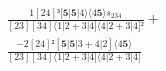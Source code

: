 \documentclass[varwidth, border=5pt]{standalone}
\begin{document}
\begin{my}
$\begin{gathered}
\scriptscriptstyle\frac{1[24]³[𝟓|𝟓|4⟩⟨4𝟓⟩s_{234}}{[23][34]⟨1|2+3|4]⟨4|2+3|4]²} +\\
\scriptscriptstyle\frac{-2[24]²[𝟓|𝟓|3+4|2]⟨4𝟓⟩}{[23][34]⟨1|2+3|4]⟨4|2+3|4]} \phantom{+}
\end{gathered}$
\end{my}
\end{document}
